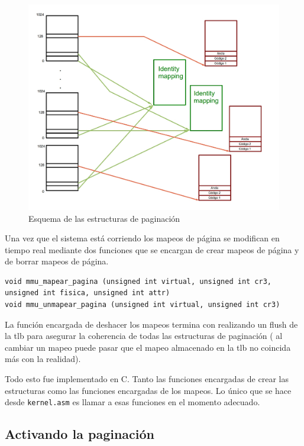 \begin{figure}[h]
\begin{center}
  \includegraphics[scale=0.3]{secciones/dibujitos/diagramapaginas.jpg}
\end{center}
\caption{Esquema de las estructuras de paginación}
\label{fig:diagramapaginas}
\end{figure}


	Una vez que el sistema está corriendo los mapeos de página se modifican
en tiempo real mediante dos funciones que se encargan de crear
mapeos de página y de borrar mapeos de página.

\begin{verbatim}
void mmu_mapear_pagina (unsigned int virtual, unsigned int cr3, unsigned int fisica, unsigned int attr) 
void mmu_unmapear_pagina (unsigned int virtual, unsigned int cr3) 
\end{verbatim}


	La función encargada de deshacer los mapeos termina con realizando un flush
de la tlb para asegurar la coherencia de todas las estructuras de paginación (
al cambiar un mapeo puede pasar que el mapeo almacenado en la tlb no coincida
más con la realidad).

	Todo esto fue implementado en C. Tanto las funciones
encargadas de crear las estructuras como las funciones encargadas
de los mapeos. Lo único que se hace desde \texttt{kernel.asm} es
llamar a esas funciones en el momento adecuado.

\subsection{Activando la paginación}


